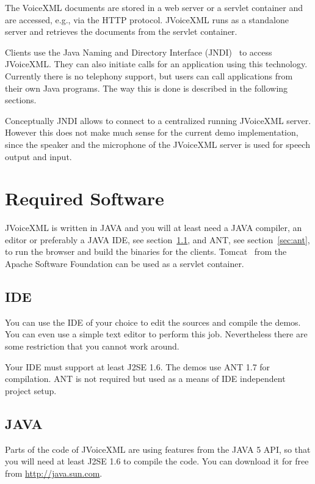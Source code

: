 \documentclass[11pt,a4paper]{article}
\begin{document}
The VoiceXML documents are stored in a web server or a servlet container
and are accessed, e.g., via the HTTP protocol.
JVoiceXML runs as a standalone server and retrieves the documents from
the servlet container. 

Clients use the Java Naming and Directory Interface (JNDI)~\cite{sun:jndi} to 
access JVoiceXML. They can also initiate calls for an application using this 
technology. Currently there is no telephony support, but users can call 
applications from their own Java programs. The way this is done is described in
the following sections.

Conceptually JNDI allows to connect to a centralized running JVoice\-XML 
server. However this does not make much sense for the current demo 
implementation, since the speaker and the microphone of the JVoiceXML server
is used for speech output and input.

\section{Required Software}
\label{sec:required-software}

JVoiceXML is written in JAVA and you will at least need a JAVA compiler, an 
editor or preferably a JAVA IDE, see section~\ref{sec:ide}, and ANT, see 
section~\ref{sec:ant}, to run the browser and build the binaries for the 
clients. Tomcat~\cite{apache:tomcat} from the Apache Software Foundation can be
used as a servlet container.

\subsection{IDE}
\label{sec:ide}

You can use the IDE of your choice to edit the sources and compile the 
demos. You can even use a simple text editor to perform this job.
Nevertheless there are some restriction that you cannot work around.

Your IDE must support at least J2SE 1.6. The demos use ANT 1.7 for compilation. 
ANT is not required but used as a means of IDE independent project setup.

\subsection{JAVA}
\label{sec:java}

Parts of the code of JVoiceXML are using features from the JAVA 5 API, so that
you will need at least J2SE 1.6 to compile the code. You can download it
for free from \url{http://java.sun.com}.
\end{document}

